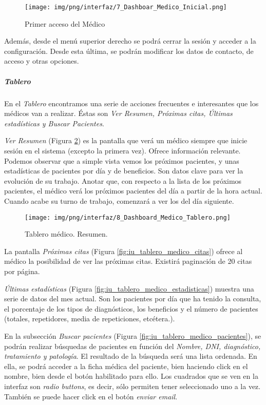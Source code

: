 \documentclass[a4paper,oneside,11pt]{book}
\begin{document}
		\begin{figure}[H]
		  \centering
		    \texttt{[image: img/png/interfaz/7\_Dashboar\_Medico\_Inicial.png]}
		  \caption{Primer acceso del Médico}
		  \label{fig:iu_tablero_medico_inicial}
		\end{figure}
	
		Además, desde el menú superior derecho se podrá cerrar la sesión y acceder a la configuración. Desde esta última, se podrán modificar los datos de contacto, de acceso y otras opciones.
		
		\subparagraph{Tablero} %
		\label{par:medico_tablero}
		
			En el \textit{Tablero} encontramos una serie de acciones frecuentes e interesantes que los médicos van a realizar. Éstas son \textit{Ver Resumen, Próximas citas, Últimas estadísticas y Buscar Pacientes}.
			
			\textit{Ver Resumen} (Figura \ref{fig:iu_tablero_medico_resumen}) es la pantalla que verá un médico siempre que inicie sesión en el sistema (excepto la primera vez). Ofrece información relevante. Podemos observar que a simple vista vemos los próximos pacientes, y unas estadísticas de pacientes por día y de beneficios. Son datos clave para ver la evolución de su trabajo. Anotar que, con respecto a la lista de los próximos pacientes, el médico verá los próximos pacientes del día a partir de la hora actual. Cuando acabe su turno de trabajo, comenzará a ver los del día siguiente.
		
			\begin{figure}[H]
			  \centering
			    \texttt{[image: img/png/interfaz/8\_Dashboard\_Medico\_Tablero.png]}
			  \caption{Tablero médico. Resumen.}
			  \label{fig:iu_tablero_medico_resumen}
			\end{figure}
			
			La pantalla \textit{Próximas citas} (Figura \ref{fig:iu_tablero_medico_citas}) ofrece al médico la posibilidad de ver las próximas citas. Existirá paginación de 20 citas por página.	
			
			\textit{Últimas estadísticas} (Figura \ref{fig:iu_tablero_medico_estadisticas}) muestra una serie de datos del mes actual. Son los pacientes por día que ha tenido la consulta, el porcentaje de los tipos de diagnósticos, los beneficios y el número de pacientes (totales, repetidores, media de repeticiones, etcétera.).
		
			En la subsección \textit{Buscar pacientes} (Figura \ref{fig:iu_tablero_medico_pacientes}), se podrán realizar búsquedas de pacientes en función del \textit{Nombre, DNI, diagnóstico, tratamiento y patología}. El resultado de la búsqueda será una lista ordenada. En ella, se podrá acceder a la ficha médica del paciente, bien haciendo click en el nombre, bien desde el botón habilitado para ello. Los cuadrados que se ven en la interfaz son \textit{radio buttons}, es decir, sólo permiten tener seleccionado uno a la vez. También se puede hacer click en el botón \textit{enviar email}.
			
\end{document}
